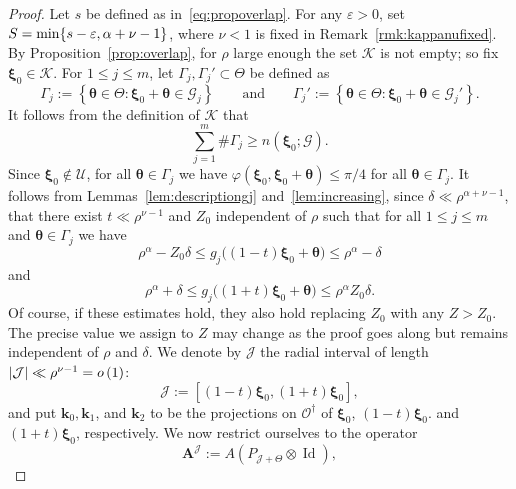 \documentclass[10pt]{amsart}
\theoremstyle{definition}\newtheorem{defi}[theo]{Definition}\newtheorem{rema}[theo]{Remark}\newtheorem{exam}[theo]{Example}\newtheorem{nota}[theo]{Notation}
\DeclareMathOperator{\Id}{Id}
\newcommand{\CG}{\mathcal{G}}
\newcommand{\CJ}{\mathcal{J}}
\newcommand{\CK}{\mathcal{K}}
\newcommand{\CO}{\mathcal{O}}
\newcommand{\CU}{\mathcal{U}}
\newcommand{\btheta}{\boldsymbol \theta}
\newcommand{\bxi}{\boldsymbol \xi}
\newcommand{\BA}{\mathbf A}
\newcommand{\bk}{\mathbf k}
\renewcommand{\phi}{\varphi}
\newcommand{\eps}{\varepsilon}
\newcommand{\smallo}[1]{o\left(#1 \right)}
\newcommand{\abs}[1]{\left\lvert #1 \right\rvert}
\newcommand{\set}[1]{\left\{ #1 \right\}}
\begin{document}
\begin{proof}
Let $s$ be defined as in~\eqref{eq:propoverlap}. For any $\eps > 0$, set $S = \min \{s - \eps, \alpha + \nu\linebreak - 1\}$, where $\nu < 1$ is fixed in Remark~\ref{rmk:kappanufixed}. By Proposition~\ref{prop:overlap}, for $\rho$ large enough the set $\CK$ is not empty; so fix $\bxi_0 \in \CK$. For $1 \le j \le m$, let $\Gamma_j, \Gamma_j' \subset \Theta$ be defined as
\begin{equation}
\Gamma_j := \set{\btheta \in \Theta : \bxi_0 + \btheta \in \CG_j}
\qquad
\text{and} \qquad \Gamma_j' := \set{\btheta \in \Theta : \bxi_0 +
\btheta \in \CG_j'}.
\end{equation}
It follows from the definition of $\CK$ that
\begin{equation}
\sum_{j=1}^m \#\Gamma_j \ge n(\bxi_0;\CG).
\end{equation}
Since $\bxi_0 \not \in \CU$, for all $\btheta \in \Gamma_j$ we have $\phi(\bxi_0,\bxi_0 + \btheta) \le \pi/4$ for all $\btheta \in \Gamma_j$. It follows from Lemmas~\ref{lem:descriptiongj} and~\ref{lem:increasing}, since $\delta \ll \rho^{\alpha + \nu - 1}$, that there exist $t \ll \rho^{\nu - 1}$ and $Z_0$ independent of $\rho$ such that for all $1 \le j \le m$ and $\btheta
\in \Gamma_j$ we have
\begin{equation}\label{eq:botovlp}
\rho^\alpha - Z_0\delta \le g_j\big((1 - t) \bxi_0 + \btheta \big) \le
\rho^\alpha - \delta
\end{equation}
and
\begin{equation}\label{eq:topovlp}
\rho^\alpha + \delta \le g_j\big((1 + t) \bxi_0 + \btheta \big) \le
\rho^\alpha Z_0 \delta.
\end{equation}
Of course, if these estimates hold, they also hold replacing $Z_0$ with any $Z > Z_0$. The precise value we assign to $Z$ may change as the proof goes along but remains independent of $\rho$ and $\delta$. We denote by $\CJ$ the radial interval of length $\abs \CJ \ll \rho^{\nu - 1}\linebreak = \smallo 1$:
\begin{equation}
\CJ := [(1-t) \bxi_0, (1+t) \bxi_0],
\end{equation}
and put $\bk_0, \bk_1$, and $\bk_2$ to be the projections on $\CO^\dagger$ of $\bxi_0$, $(1-t)\bxi_0$. and $(1+t)\bxi_0$, respectively. We now restrict ourselves to the operator
\begin{equation}
\BA^\CJ := A(P_{\CJ + \Theta} \otimes \Id),
\end{equation}

\end{proof}
\end{document}
